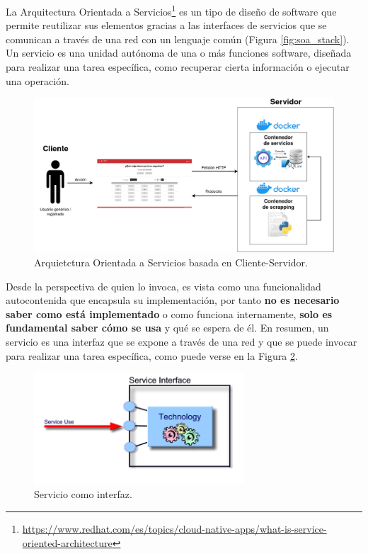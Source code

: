 La Arquitectura Orientada a Servicios\footnote{\url{https://www.redhat.com/es/topics/cloud-native-apps/what-is-service-oriented-architecture}} es un tipo de diseño de software que permite reutilizar sus elementos gracias a las interfaces de servicios que se comunican a través de una red con un lenguaje común (Figura \ref{fig:soa_stack}). Un servicio es una unidad autónoma de una o más funciones software, diseñada para realizar una tarea específica, como recuperar cierta información o ejecutar una operación.\newline

\begin{figure}[H]
    \centering
    \includegraphics[width=1\textwidth]{./imagenes/Arq_Soft_informal.png}
    \caption{Arquietctura Orientada a Servicios basada en Cliente-Servidor.}
    \label{fig:soa}
\end{figure}

Desde la perspectiva de quien lo invoca, es vista como una funcionalidad autocontenida que encapsula su implementación, por tanto \textbf{no es necesario saber como está implementado} o como funciona internamente, \textbf{solo es fundamental saber cómo se usa} y qué se espera de él. En resumen, un servicio es una interfaz que se expone a través de una red y que se puede invocar para realizar una tarea específica, como puede verse en la Figura \ref{fig:soa_interface}.\newline

\begin{figure}[H]
    \centering
    \includegraphics[width=0.7\textwidth]{./imagenes/Interfaz_SOA.png}
    \caption{Servicio como interfaz.}
    \label{fig:soa_interface}
\end{figure}


